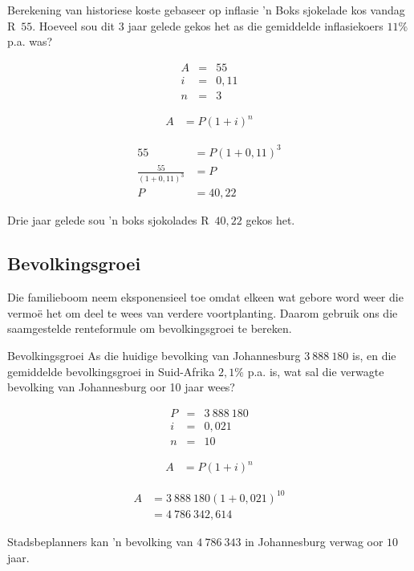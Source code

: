 \begin{wex}{Berekening van historiese koste gebaseer op inflasie}
    {'n Boks sjokelade kos vandag R~$55$. Hoeveel sou dit $3$ jaar gelede gekos het as die gemiddelde inflasiekoers $11\%$ p.a. was?}
{
    \begin{eqnarray*}
	A &=& 55\\
	i &=& 0,11\\
	n &=& 3
    \end{eqnarray*}

    \begin{align*}
	A &= P(1 + i)^n
    \end{align*}

    \begin{align*}
	55 &= P(1 + 0,11)^3\\
	\frac{55}{(1 + 0,11)^3} &= P\\
	P  &= 40,22
    \end{align*}

    Drie jaar gelede sou 'n boks sjokolades R~$40,22$ gekos het.
    }
\end{wex}


\subsection{Bevolkingsgroei}

 Die familieboom neem eksponensieel toe omdat elkeen wat gebore word weer die vermo\"e het om deel te wees van verdere voortplanting. Daarom gebruik ons die saamgestelde renteformule om bevolkingsgroei te bereken.


\begin{wex}{Bevolkingsgroei}
    {As die huidige bevolking van Johannesburg $3~888~180$ is, en die gemiddelde bevolkingsgroei in Suid-Afrika $2,1\%$ p.a. is, wat sal die verwagte bevolking van Johannesburg oor 10 jaar wees?}{
    
    \begin{eqnarray*}
	P &=& 3~888~180\\
	i &=& 0,021\\
	n &=& 10
    \end{eqnarray*}

    \begin{align*}
	A &= P(1 + i)^n
    \end{align*}

    \begin{align*}
	A &= 3~888~180(1 + 0,021)^{10}\\
	  &= 4~786~342,614
    \end{align*}

    Stadsbeplanners kan 'n bevolking van $4~786~343$ in Johannesburg verwag oor $10$ jaar.
    }
\end{wex}


